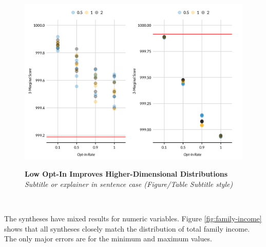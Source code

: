 \documentclass[
]{urban-formatting}
\begin{document}
\begin{figure}[htbp]
    \caption{
    \textbf{Low Opt-In Improves Higher-Dimensional Distributions}\\
    \textit{Subtitle or explainer in sentence case (Figure/Table Subtitle style)}
    }
    \centering
    \includegraphics[width=6.5in]{../analysis/figures/kmarginals-4.png}
    \label{fig:kmarginals}
\end{figure}
\begin{singlespace}
    \\
\end{singlespace}

The syntheses have mixed results for numeric variables. Figure
\ref{fig:family-income} shows that all syntheses closely match the
distribution of total family income. The only major errors are for the
minimum and maximum values.
\end{document}
